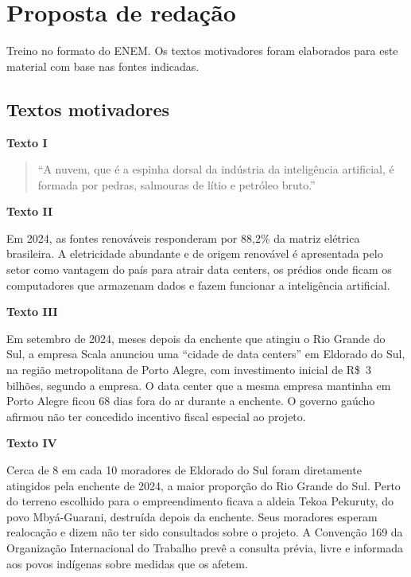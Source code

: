 \documentclass[11pt]{article}
\begin{document}
\clearpage
\section{Proposta de redação}
Treino no formato do ENEM. Os textos motivadores foram elaborados para este material com base nas fontes indicadas.

\subsection*{Textos motivadores}

\textbf{Texto I}\par\nopagebreak
\begin{quote}
\enquote{A nuvem, que é a espinha dorsal da indústria da inteligência artificial, é formada por pedras, salmouras de
lítio e petróleo bruto.}
\end{quote}

\medskip
\textbf{Texto II}\par\nopagebreak
Em 2024, as fontes renováveis responderam por 88,2\% da matriz elétrica brasileira. A eletricidade abundante e de
origem renovável é apresentada pelo setor como vantagem do país para atrair data centers, os prédios onde ficam os
computadores que armazenam dados e fazem funcionar a inteligência artificial.

\medskip
\textbf{Texto III}\par\nopagebreak
Em setembro de 2024, meses depois da enchente que atingiu o Rio Grande do Sul, a empresa Scala anunciou uma
\enquote{cidade de data centers} em Eldorado do Sul, na região metropolitana de Porto Alegre, com investimento inicial
de R\$~3 bilhões, segundo a empresa. O data center que a mesma empresa mantinha em Porto Alegre ficou 68 dias fora
do ar durante a enchente. O governo gaúcho afirmou não ter concedido incentivo fiscal especial ao projeto.

\medskip
\textbf{Texto IV}\par\nopagebreak
Cerca de 8 em cada 10 moradores de Eldorado do Sul foram diretamente atingidos pela enchente de 2024, a maior
proporção do Rio Grande do Sul. Perto do terreno escolhido para o empreendimento ficava a aldeia Tekoa Pekuruty,
do povo Mbyá-Guarani, destruída depois da enchente. Seus moradores esperam realocação e dizem não ter sido
consultados sobre o projeto. A Convenção 169 da Organização Internacional do Trabalho prevê a consulta prévia,
livre e informada aos povos indígenas sobre medidas que os afetem.
\end{document}
